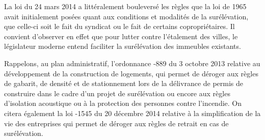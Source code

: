	La loi du 24 mars 2014 a littéralement bouleversé les règles que la loi de 1965 avait initialement posées quant aux conditions et modalités de la surélévation, que celle-ci soit le fait du syndicat ou le fait de certains copropriétaires. Il convient d’observer en effet que pour lutter contre l’étalement des villes, le législateur moderne entend faciliter la surélévation des immeubles existants.
	
	Rappelons, au plan administratif, l’ordonnance -889 du 3 octobre 2013 relative au développement de la construction de logements, qui permet de déroger aux règles de gabarit, de densité et de stationnement lors de la délivrance de permis de construire dans le cadre d’un projet de surélévation ou encore aux règles d’isolation acoustique ou à la protection des personnes contre l’incendie. On citera également la loi -1545 du 20 décembre 2014 relative à la simplification de la vie des entreprises qui permet de déroger aux règles de retrait en cas de surélévation.
	
